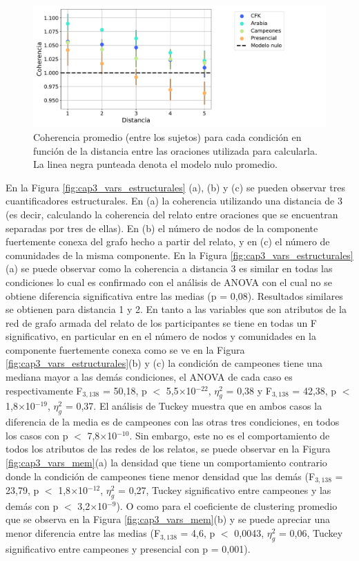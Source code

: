 \begin{figure}[H]
    \centering
    \includegraphics[width = 15cm]{figures/ch03/Herramientas NPL/Primer tiempo/Sin control/coherencia_vs_t_conmodelonulo.pdf} 
    \caption{Coherencia promedio (entre los sujetos) para cada condición en función de la distancia entre las oraciones utilizada para calcularla. La linea negra punteada denota el modelo nulo promedio.}
\label{fig:cap3_coherencia_d}
\end{figure}

En la Figura \ref{fig:cap3_vars_estructurales} (a), (b) y (c) se pueden observar tres cuantificadores estructurales. En (a) la coherencia utilizando una distancia de 3 (es decir, calculando la coherencia del relato entre oraciones que se encuentran separadas por tres de ellas). En (b) el número de nodos de la componente fuertemente conexa del grafo hecho a partir del relato, y en (c) el número de comunidades de la misma componente. En la Figura \ref{fig:cap3_vars_estructurales}(a) se puede observar como la coherencia a distancia 3 es similar en todas las condiciones lo cual es confirmado con el análisis de ANOVA con el cual no se obtiene diferencia significativa entre las medias (p = 0,08). Resultados similares se obtienen para distancia 1 y 2. En tanto a las variables que son atributos de la red de grafo armada del relato de los participantes se tiene en todas un F significativo, en particular en en el número de nodos y comunidades en la componente fuertemente conexa como se ve en la Figura \ref{fig:cap3_vars_estructurales}(b) y (c) la condición de campeones tiene una mediana mayor a las demás condiciones, el ANOVA de cada caso es respectivamente F$_{3, 138}$ = 50,18, p $<$ 5,5$\times$10$^{-22}$, $\eta_g^2$ = 0,38 y F$_{3, 138}$ = 42,38,  p $<$ 1,8$\times$10$^{-19}$, $\eta_g^2$ = 0,37. El análisis de Tuckey muestra que en ambos casos la diferencia de la media es de campeones con las otras tres condiciones, en todos los casos con  p $<$ 7,8$\times$10$^{-10}$.
Sin embargo, este no es el comportamiento de todos los atributos de las redes de los relatos, se puede observar en la Figura \ref{fig:cap3_vars_mem}(a) la densidad que tiene un comportamiento contrario donde la condición de campeones tiene menor densidad que las demás (F$_{3, 138}$ = 23,79, p $<$ 1,8$\times$10$^{-12}$, $\eta_g^2$ = 0,27, Tuckey significativo entre campeones y las demás con p $<$ 3,2$\times$10$^{-9}$). O como para el coeficiente de clustering promedio que se observa en la Figura \ref{fig:cap3_vars_mem}(b) y se puede apreciar una menor diferencia entre las medias (F$_{3, 138}$ = 4,6, p $<$ 0,0043, $\eta_g^2$ = 0,06, Tuckey significativo entre campeones y presencial con p = 0,001).


